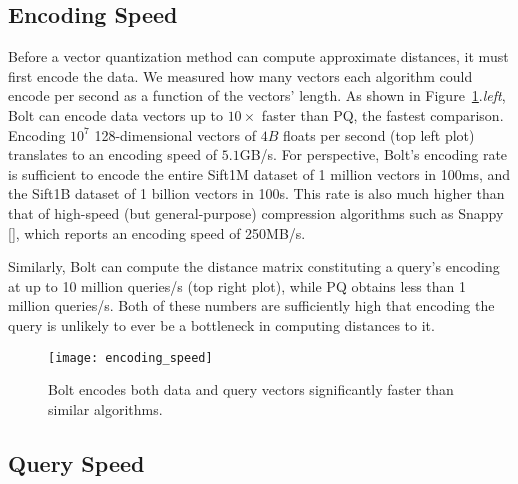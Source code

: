 \subsection{Encoding Speed}
Before a vector quantization method can compute approximate distances, it must first encode the data. We measured how many vectors each algorithm could encode per second as a function of the vectors' length. As shown in Figure~\ref{fig:encoding_speeds}.\textit{left}, Bolt can encode data vectors up to $10\times$ faster than PQ, the fastest comparison. Encoding $10^7$ 128-dimensional vectors of $4B$ floats per second (top left plot) translates to an encoding speed of $5.1$GB/s. For perspective, Bolt's encoding rate is sufficient to encode the entire Sift1M dataset of 1 million vectors in 100ms, and the Sift1B dataset of 1 billion vectors in 100s. This rate is also much higher than that of high-speed (but general-purpose) compression algorithms such as Snappy [], which reports an encoding speed of 250MB/s.

Similarly, Bolt can compute the distance matrix constituting a query's encoding at up to 10 million queries/s (top right plot), while PQ obtains less than 1 million queries/s. Both of these numbers are sufficiently high that encoding the query is unlikely to ever be a bottleneck in computing distances to it.

\begin{figure}[h]
\begin{center}
\label{fig:encoding_speeds}
\texttt{[image: encoding\_speed]}
\vspace*{-1mm}
\caption{Bolt encodes both data and query vectors significantly faster than similar algorithms.}
\end{center}
\end{figure}



\subsection{Query Speed}

